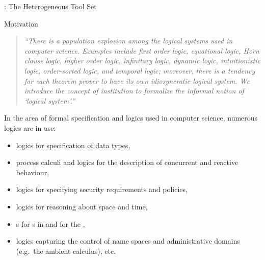 
\begin{omgroup}[short=HETS,
   creators={mossakowski,maeder,luettich}]
   {\hets: The Heterogeneous Tool Set}


\begin{omgroup}{Motivation}

\begin{quote}\sl\small
  ``There is a population explosion among the logical systems used in computer
  science. Examples include first order logic, equational logic, Horn clause logic, higher
  order logic, infinitary logic, dynamic logic, intuitionistic logic, order-sorted logic,
  and temporal logic; moreover, there is a tendency for each theorem prover to have its
  own idiosyncratic logical system. We introduce the concept of \emph{institution} to
  formalize the informal notion of `logical system'.''~\cite{GoguenBurstall92}
\end{quote}

In the area of formal specification and logics used in computer
science, numerous logics are in use:
\begin{itemize}
\item logics for specification of data types,
\item process calculi and logics for the description of concurrent
  and reactive behaviour,
\item logics for specifying security requirements and policies,
\item logics for reasoning about space and time,
\item {s} for {s} in
  {} and for the {},
\item logics capturing the control of name spaces and administrative domains (e.g.\ the
  ambient calculus), etc.
\end{itemize}


\end{omgroup}
\end{omgroup}
